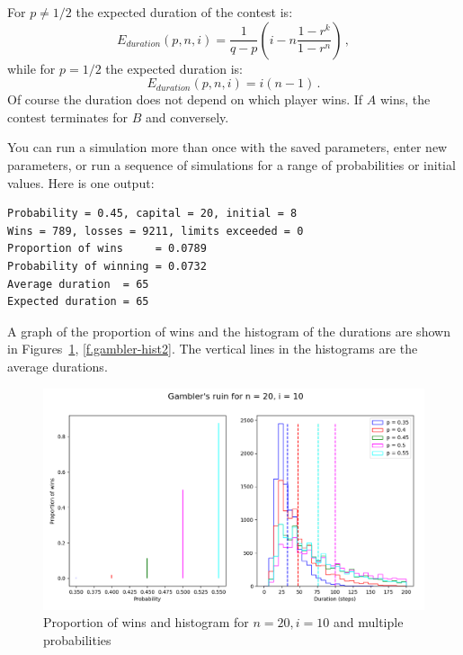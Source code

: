 \documentclass[11pt,a4paper]{article}
\begin{document}
For $p\neq 1/2$ the expected duration of the contest is:
\[
E_{\mathit{duration}}(p,n,i)=\frac{1}{q-p}\left(i-n
\frac{1-r^k}{1-r^n}\right)\,,
\]
while for $p=1/2$ the expected duration is:
\[
E_{\mathit{duration}}(p,n,i)=i(n-1)\,.
\]
Of course the duration does not depend on which player wins. If $A$ wins, the contest terminates for $B$ and conversely.

You can run a simulation more than once with the saved parameters, enter new parameters, or run a sequence of simulations for a range of probabilities or initial values. Here is one output:
\begin{verbatim}
Probability = 0.45, capital = 20, initial = 8
Wins = 789, losses = 9211, limits exceeded = 0
Proportion of wins     = 0.0789
Probability of winning = 0.0732
Average duration  = 65
Expected duration = 65
\end{verbatim}
A graph of the proportion of wins and the histogram of the durations are shown in Figures~\ref{f.gambler-hist1}, \ref{f.gambler-hist2}. The vertical lines in the histograms are the average durations.

\begin{figure}
\begin{center}
\includegraphics[width=\textwidth]{gamblers-ruin-01}
\caption{Proportion of wins and histogram for $n=20, i=10$ and multiple probabilities}\label{f.gambler-hist1}
\end{center}
\end{figure}
\end{document}
